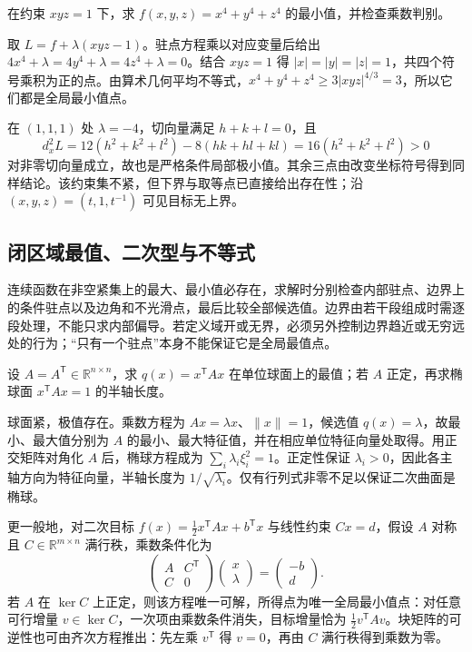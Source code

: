 \begin{example}
在约束 $xyz=1$ 下，求 $f(x,y,z)=x^4+y^4+z^4$ 的最小值，并检查乘数判别。
\end{example}
\begin{solve}
取 $L=f+\lambda(xyz-1)$。驻点方程乘以对应变量后给出 $4x^4+\lambda=4y^4+\lambda=4z^4+\lambda=0$。结合 $xyz=1$ 得 $|x|=|y|=|z|=1$，共四个符号乘积为正的点。由算术几何平均不等式，$x^4+y^4+z^4\ge3|xyz|^{4/3}=3$，所以它们都是全局最小值点。

在 $(1,1,1)$ 处 $\lambda=-4$，切向量满足 $h+k+l=0$，且
\[
d_x^2L=12(h^2+k^2+l^2)-8(hk+hl+kl)=16(h^2+k^2+l^2)>0
\]
对非零切向量成立，故也是严格条件局部极小值。其余三点由改变坐标符号得到同样结论。该约束集不紧，但下界与取等点已直接给出存在性；沿 $(x,y,z)=(t,1,t^{-1})$ 可见目标无上界。
\end{solve}

\subsection{闭区域最值、二次型与不等式}

连续函数在非空紧集上的最大、最小值必存在，求解时分别检查内部驻点、边界上的条件驻点以及边角和不光滑点，最后比较全部候选值。边界由若干段组成时需逐段处理，不能只求内部偏导。若定义域开或无界，必须另外控制边界趋近或无穷远处的行为；“只有一个驻点”本身不能保证它是全局最值点。

\begin{example}
设 $A=A^{\mathsf T}\in\mathbb R^{n\times n}$，求 $q(x)=x^{\mathsf T}Ax$ 在单位球面上的最值；若 $A$ 正定，再求椭球面 $x^{\mathsf T}Ax=1$ 的半轴长度。
\end{example}
\begin{solve}
球面紧，极值存在。乘数方程为 $Ax=\lambda x$、$\|x\|=1$，候选值 $q(x)=\lambda$，故最小、最大值分别为 $A$ 的最小、最大特征值，并在相应单位特征向量处取得。用正交矩阵对角化 $A$ 后，椭球方程成为 $\sum_i\lambda_i\xi_i^2=1$。正定性保证 $\lambda_i>0$，因此各主轴方向为特征向量，半轴长度为 $1/\sqrt{\lambda_i}$。仅有行列式非零不足以保证二次曲面是椭球。
\end{solve}

更一般地，对二次目标 $f(x)=\tfrac12x^{\mathsf T}Ax+b^{\mathsf T}x$ 与线性约束 $Cx=d$，假设 $A$ 对称且 $C\in\mathbb R^{m\times n}$ 满行秩，乘数条件化为
\[
\begin{pmatrix}A&C^{\mathsf T}\\C&0\end{pmatrix}\begin{pmatrix}x\\\lambda\end{pmatrix}=\begin{pmatrix}-b\\d\end{pmatrix}.
\]
若 $A$ 在 $\ker C$ 上正定，则该方程唯一可解，所得点为唯一全局最小值点：对任意可行增量 $v\in\ker C$，一次项由乘数条件消失，目标增量恰为 $\tfrac12v^{\mathsf T}Av$。块矩阵的可逆性也可由齐次方程推出：先左乘 $v^{\mathsf T}$ 得 $v=0$，再由 $C$ 满行秩得到乘数为零。


